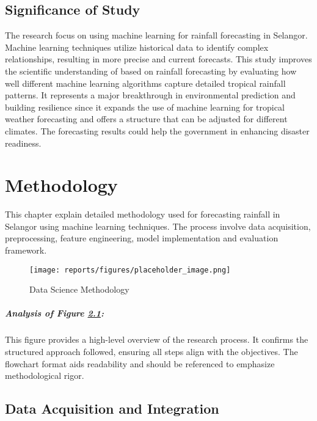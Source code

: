 \documentclass[12pt]{article}
\begin{document}
\section{Significance of Study}
\label{sec:significance_of_study}
The research focus on using machine learning for rainfall forecasting in Selangor. Machine learning techniques utilize historical data to identify complex relationships, resulting in more precise and current forecasts. This study improves the scientific understanding of based on rainfall forecasting by evaluating how well different machine learning algorithms capture detailed tropical rainfall patterns. It represents a major breakthrough in environmental prediction and building resilience since it expands the use of machine learning for tropical weather forecasting and offers a structure that can be adjusted for different climates. The forecasting results could help the government in enhancing disaster readiness.

\chapter{Methodology}
\label{chap:methodology}

This chapter explain detailed methodology used for forecasting rainfall in Selangor using machine learning techniques. The process involve data acquisition, preprocessing, feature engineering, model implementation and evaluation framework.

\begin{figure}[H]
    \centering
    \texttt{[image: reports/figures/placeholder\_image.png]} %
    \caption{Data Science Methodology}
    \label{fig:3_1_data_science_methodology}
\end{figure}

\paragraph{Analysis of Figure \ref{fig:3_1_data_science_methodology}:}
This figure provides a high-level overview of the research process. It confirms the structured approach followed, ensuring all steps align with the objectives. The flowchart format aids readability and should be referenced to emphasize methodological rigor.

\section{Data Acquisition and Integration}
\label{sec:data_acquisition}
\end{document}
